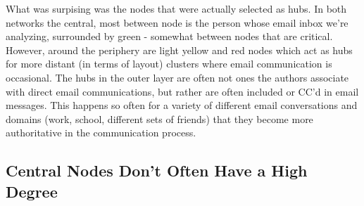 \documentclass[11pt,letterpaper]{article}
\begin{document}
What was surpising was the nodes that were actually selected as hubs. In both networks the central, most between node is the person whose email inbox we're analyzing, surrounded by green - somewhat between nodes that are critical. However, around the periphery are light yellow and red nodes which act as hubs for more distant (in terms of layout) clusters where email communication is occasional. The hubs in the outer layer are often not ones the authors associate with direct email communications, but rather are often included or CC'd in email messages. This happens so often for a variety of different email conversations and domains (work, school, different sets of friends) that they become more authoritative in the communication process.

\subsection*{Central Nodes Don't Often Have a High Degree}
\end{document}

